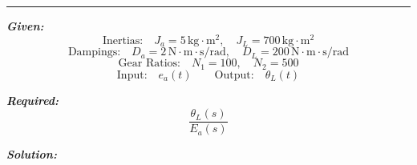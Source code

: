 \documentclass[11pt]{article}
\begin{document}
\noindent\rule{\textwidth}{1pt}

\vspace{12pt}


\noindent\textbf{\textit{Given:}}
\[
\text{Inertias:} \quad J_a = 5\,\text{kg} \cdot \text{m}^2, \quad J_L = 700\,\text{kg} \cdot \text{m}^2
\]
\[
\text{Dampings:} \quad D_a = 2\,\text{N} \cdot \text{m} \cdot \text{s/rad}, \quad D_L = 200\,\text{N} \cdot \text{m} \cdot \text{s/rad}
\]
\[
\text{Gear Ratios:} \quad N_1 = 100, \quad N_2 = 500
\]
\[
\text{Input:} \quad e_a(t)
\quad\quad
\text{Output:} \quad \theta_L(t)
\]

\vspace{1em}
\noindent

\noindent\textbf{\textit{Required:}}
\[
\frac{\theta_L(s)}{E_a(s)}
\]

\vspace{1.5em}
\noindent\textbf{\textit{Solution:}}

\vspace{5pt}
\end{document}
